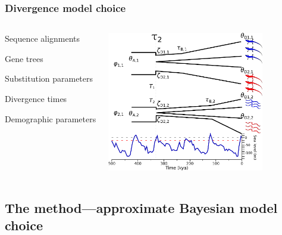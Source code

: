 \begin{frame}
    \frametitle{Divergence model choice}
    \begin{columns}[c]
            \begin{mydescription}
                \item<2->[\alignmentVector] Sequence alignments
                \item<3->[\geneTreeVector] Gene trees
                \item<4->[\hkyModelVector] Substitution parameters
                \item<5->[\divTimeMapVector] Divergence times
                \item<6->[\demographicParamVector] Demographic parameters
            \end{mydescription}
            \includegraphics[height=6.1cm]{images/sea-level-msbayes-model-labels.pdf}
    \end{columns}
\end{frame}

\subsection{The method---approximate Bayesian model choice}



